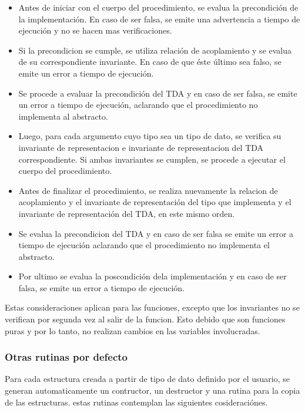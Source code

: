 \begin{itemize}

  \item Antes de iniciar con el cuerpo del procedimiento, se
  evalua la precondición de la implementación. En caso de ser falsa, se
  emite una advertencia a tiempo de ejecución y no se hacen mas verificaciones.

  \item Si la precondicion se cumple, se utiliza relación de acoplamiento y se
  evalua de su correspondiente invariante. En caso de que éste último sea
  falso, se emite un error a tiempo de ejecución.

  \item Se procede a evaluar la precondición del TDA y en caso de ser falsa,
  se emite un error a tiempo de ejecución, aclarando que el procedimiento no
  implementa al abstracto.

  \item Luego, para cada argumento cuyo tipo sea un tipo de dato, se verifica
  su invariante de representacion e invariante de representacion del TDA
  correspondiente. Si ambas invariantes se cumplen, se procede a ejecutar el
  cuerpo del procedimiento.

  \item Antes de finalizar el procedimiento, se realiza nuevamente la relacion
  de acoplamiento y el invariante de representación del tipo que implementa y
  el invariante de representación del TDA, en este mismo orden.

  \item Se evalua la precondicion del TDA y en caso de ser falsa se emite un
  error a tiempo de ejecución aclarando que el procedimiento no implementa el
  abstracto.

  \item Por ultimo se evalua la poscondición dela implementación y en caso de
  ser falsa, se emite un error a tiempo de ejecución.

\end{itemize}

Estas consideraciones aplican para las funciones, excepto que los invariantes
no se verifican por segunda vez al salir de la funcion. Esto debido que son
funciones puras y por lo tanto, no realizan cambios en las variables
involucradas.

\subsubsection{Otras rutinas por defecto}
Para cada estructura creada a partir de tipo de dato definido por el usuario,
se generan automaticamente un contructor, un destructor y una rutina para la
copia de las estructuras. estas rutinas contemplan las siguientes
cosideraciónes.

